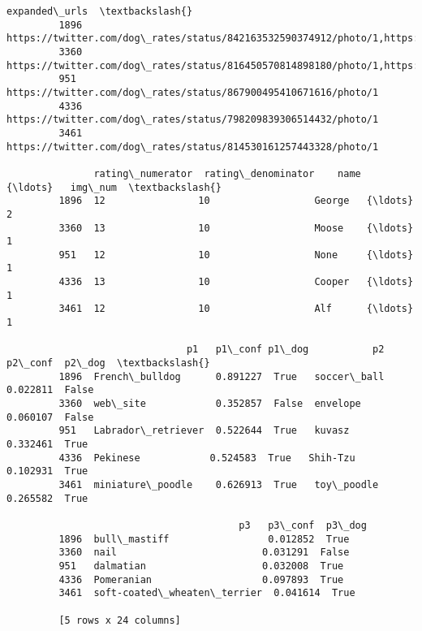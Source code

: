 \documentclass[11pt]{article}
\begin{document}
\begin{Verbatim}[commandchars=\\\{\}]
                                                                                                                                 expanded\_urls  \textbackslash{}
         1896  https://twitter.com/dog\_rates/status/842163532590374912/photo/1,https://twitter.com/dog\_rates/status/842163532590374912/photo/1   
         3360  https://twitter.com/dog\_rates/status/816450570814898180/photo/1,https://twitter.com/dog\_rates/status/816450570814898180/photo/1   
         951   https://twitter.com/dog\_rates/status/867900495410671616/photo/1                                                                   
         4336  https://twitter.com/dog\_rates/status/798209839306514432/photo/1                                                                   
         3461  https://twitter.com/dog\_rates/status/814530161257443328/photo/1                                                                   
         
               rating\_numerator  rating\_denominator    name   {\ldots}   img\_num  \textbackslash{}
         1896  12                10                  George   {\ldots}    2        
         3360  13                10                  Moose    {\ldots}    1        
         951   12                10                  None     {\ldots}    1        
         4336  13                10                  Cooper   {\ldots}    1        
         3461  12                10                  Alf      {\ldots}    1        
         
                               p1   p1\_conf p1\_dog           p2   p2\_conf  p2\_dog  \textbackslash{}
         1896  French\_bulldog      0.891227  True   soccer\_ball  0.022811  False    
         3360  web\_site            0.352857  False  envelope     0.060107  False    
         951   Labrador\_retriever  0.522644  True   kuvasz       0.332461  True     
         4336  Pekinese            0.524583  True   Shih-Tzu     0.102931  True     
         3461  miniature\_poodle    0.626913  True   toy\_poodle   0.265582  True     
         
                                        p3   p3\_conf  p3\_dog  
         1896  bull\_mastiff                 0.012852  True    
         3360  nail                         0.031291  False   
         951   dalmatian                    0.032008  True    
         4336  Pomeranian                   0.097893  True    
         3461  soft-coated\_wheaten\_terrier  0.041614  True    
         
         [5 rows x 24 columns]
\end{Verbatim}
            
\end{document}
